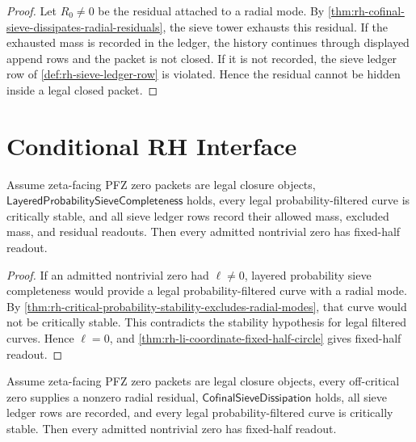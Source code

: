 \begin{proof}
Let $R_0\ne0$ be the residual attached to a radial mode.  By
\autoref{thm:rh-cofinal-sieve-dissipates-radial-residuals}, the sieve
tower exhausts this residual.  If the exhausted mass is recorded in the
ledger, the history continues through displayed append rows and the
packet is not closed.  If it is not recorded, the sieve ledger row of
\autoref{def:rh-sieve-ledger-row} is violated.  Hence the residual
cannot be hidden inside a legal closed packet.
\end{proof}

\section{Conditional RH Interface}
\label{sec:rh-layered-prime-probability-rh-interface}

\begin{theorem}
\label{thm:rh-layered-probability-sieve-conditional-fixed-half-readout}
Assume zeta-facing PFZ zero packets are legal closure objects,
$\mathsf{LayeredProbabilitySieveCompleteness}$ holds, every legal
probability-filtered curve is critically stable, and all sieve ledger
rows record their allowed mass, excluded mass, and residual readouts.
Then every admitted nontrivial zero has fixed-half readout.
\end{theorem}

\begin{proof}
If an admitted nontrivial zero had $\ell\ne0$, layered probability
sieve completeness would provide a legal probability-filtered curve
with a radial mode.  By
\autoref{thm:rh-critical-probability-stability-excludes-radial-modes},
that curve would not be critically stable.  This contradicts the
stability hypothesis for legal filtered curves.  Hence $\ell=0$, and
\autoref{thm:rh-li-coordinate-fixed-half-circle} gives fixed-half
readout.
\end{proof}

\begin{theorem}
\label{thm:rh-cofinal-probability-sieve-conditional-fixed-half-readout}
Assume zeta-facing PFZ zero packets are legal closure objects, every
off-critical zero supplies a nonzero radial residual,
$\mathsf{CofinalSieveDissipation}$ holds, all sieve ledger rows are
recorded, and every legal probability-filtered curve is critically
stable.  Then every admitted nontrivial zero has fixed-half readout.
\end{theorem}

